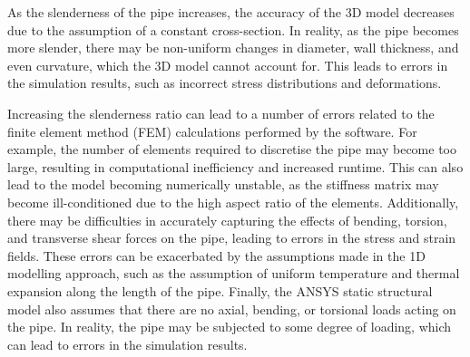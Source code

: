 As the slenderness of the pipe increases, the accuracy of the 3D model decreases due to the assumption of a constant cross-section. In reality, as the pipe becomes more slender, there may be non-uniform changes in diameter, wall thickness, and even curvature, which the 3D model cannot account for. This leads to errors in the simulation results, such as incorrect stress distributions and deformations.

Increasing the slenderness ratio can lead to a number of errors related to the finite element method (FEM) calculations performed by the software. For example, the number of elements required to discretise the pipe may become too large, resulting in computational inefficiency and increased runtime. This can also lead to the model becoming numerically unstable, as the stiffness matrix may become ill-conditioned due to the high aspect ratio of the elements. Additionally, there may be difficulties in accurately capturing the effects of bending, torsion, and transverse shear forces on the pipe, leading to errors in the stress and strain fields. These errors can be exacerbated by the assumptions made in the 1D modelling approach, such as the assumption of uniform temperature and thermal expansion along the length of the pipe.
Finally, the ANSYS static structural model also assumes that there are no axial, bending, or torsional loads acting on the pipe. In reality, the pipe may be subjected to some degree of loading, which can lead to errors in the simulation results.